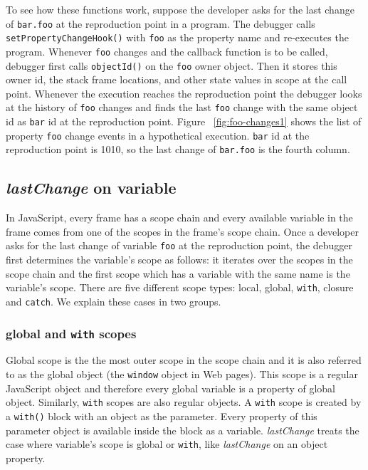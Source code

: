 \documentclass[preprint]{sigplanconf}
\begin{document}
To see how these functions work, suppose the developer asks for the
last change of \texttt{bar.foo} at the reproduction point in a
program. The debugger calls \texttt{setPropertyChangeHook()} with
\texttt{foo} as the property name and re-executes the
program. Whenever \texttt{foo} changes and the callback function is to
be called, debugger first calls \texttt{objectId()} on the
\texttt{foo} owner object. Then it stores this owner id, the stack
frame locations, and other state values in scope at the call point.
Whenever the execution reaches the reproduction point the debugger
looks at the history of \texttt{foo} changes and finds the last
\texttt{foo} change with the same object id as \texttt{bar} id at the
reproduction point. Figure ~\ref{fig:foo-changes1} shows the list of
property \texttt{foo} change events in a hypothetical
execution. \texttt{bar} id at the reproduction point is 1010, so the
last change of \texttt{bar.foo} is the fourth column. 

\subsection{\textit{lastChange} on variable} 
In JavaScript, every frame has a scope chain and every available
variable in the frame comes from one of the scopes in the frame's
scope chain. Once a developer asks for the last change of variable
\texttt{foo} at the reproduction point, the debugger first determines the
variable's scope as follows: it iterates over the scopes in the scope
chain and the first scope which has a variable with the same name is
the variable's scope. There are five different scope types: local,
global, \texttt{with}, closure and \texttt{catch}. We explain these
cases in two groups.


\subsubsection{global and \texttt{with} scopes}
Global scope is the the most outer scope in the scope chain and it is
also referred to as the global object (the \texttt{window}
object in Web pages). This scope is a regular JavaScript object and therefore every
global variable is a property of global object. Similarly,
 \texttt{with} scopes are also regular objects. A \texttt{with}
scope is created by a \texttt{with()} block with an object as the
parameter. Every property of this parameter object is available inside the
block as a variable. \textit{lastChange} treats the case where variable's scope
is global or \texttt{with}, like \textit{lastChange} on an object
property.
\end{document}
